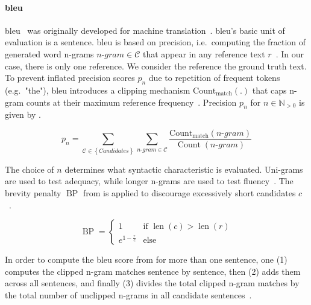 \paragraph{\ac{bleu}}
\ac{bleu}~\citep{papineni_bleu_2001} was originally developed for machine translation~\citep{zhou_paraphrase_2021,anantha_pearson_metrics_2021}. 
\ac{bleu}'s basic unit of evaluation is a sentence. 
\ac{bleu} is based on precision, i.e.\ computing the fraction of generated word n-grams $n\text{-}gram \in \mathcal{C}$ that appear in any reference text $r$~\citep{kurt_pehlivanoglu_comparative_2024,palivela_optimization_2021,papineni_bleu_2001,anantha_pearson_metrics_2021}. 
In our case, there is only one reference.
We consider the reference the ground truth text.
To prevent inflated precision scores $p_n$ due to repetition of frequent tokens (e.g.\ "the"), \ac{bleu} introduces a clipping mechanism $\operatorname{Count_{match}}(.)$ that caps n-gram counts at their maximum reference frequency~\citep{papineni_bleu_2001}. 
Precision $p_n$ for $n \in \mathbb{N}_{>0}$ is given by .

\begin{equation}
    p_n = \sum_{\mathcal{C} \in \left\{ Candidates \right\}}\sum_{n\text{-}gram \in\mathcal{C}} \frac{\operatorname{Count_{match}}(n\text{-}gram)}{\operatorname{Count}(n\text{-}gram)}
\label{eq:bleu}
\end{equation}

The choice of $n$ determines what syntactic characteristic is evaluated.
Uni-grams are used to test adequacy, while longer n-grams are used to test fluency~\citep{papineni_bleu_2001}. 
The brevity penalty $\operatorname{BP}$ from  is applied to discourage excessively short candidates $c$~\citep{papineni_bleu_2001}.

\begin{equation}
    \operatorname{BP} = \begin{cases}
        1 & \text{if } \operatorname{len}(c) > \operatorname{len}(r) \\
        e^{1 - \frac{r}{c}} & \text{else}
    \end{cases}
\label{eq:bleu_brevity_penalty}
\end{equation}

In order to compute the \ac{bleu} score from  for more than one sentence, 
one (1) computes the clipped n-gram matches sentence by sentence, 
then (2) adds them across all sentences, 
and finally (3) divides the total clipped n-gram matches by 
the total number of unclipped n-grams in all candidate sentences~\citep{papineni_bleu_2001,cordeiro_bleu_2007}.

